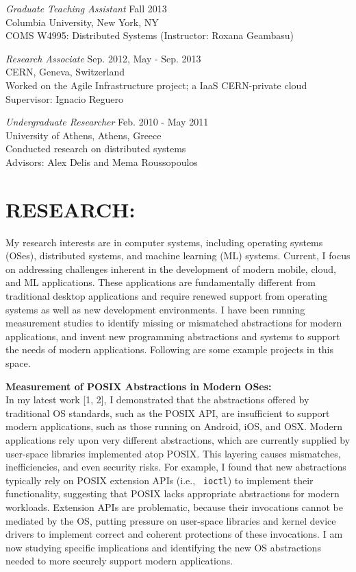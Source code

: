 \documentclass[overlapped,9pt]{res}
\begin{document}
\begin{resume}
  {\sl Graduate Teaching Assistant} \hfill Fall 2013\\
  Columbia University, New York, NY \\
  COMS W4995: Distributed Systems (Instructor: Roxana Geambasu)

  {\sl Research Associate} \hfill Sep. 2012, May - Sep. 2013 \\
  CERN, Geneva, Switzerland\\
  Worked on the Agile Infrastructure project; a IaaS CERN-private cloud\\
  Supervisor: Ignacio Reguero

  {\sl Undergraduate Researcher} \hfill Feb. 2010 - May 2011 \\
  University of Athens, Athens, Greece\\
  Conducted research on distributed systems\\
  Advisors: Alex Delis and Mema Roussopoulos

\section{RESEARCH:}
My research interests are in computer systems, including operating systems
(OSes), distributed systems, and machine learning (ML) systems. Current, I focus
on addressing challenges inherent in the development of modern mobile, cloud,
and ML applications. These applications are fundamentally different from
traditional desktop applications and require renewed support from operating
systems as well as new development environments. I have been running measurement
studies to identify missing or mismatched abstractions for modern applications,
and invent new programming abstractions and systems to support the needs of
modern applications. Following are some example projects in this space.

\textbf{Measurement of POSIX Abstractions in Modern OSes:}\\
In my latest work [1, 2], I demonstrated that the abstractions offered by
traditional OS standards, such as the POSIX API, are insufficient to support
modern applications, such as those running on Android, iOS, and OSX. Modern
applications rely upon very different abstractions, which are currently supplied
by user-space libraries implemented atop POSIX. This layering
causes mismatches, inefficiencies, and even security risks.  For example, I
found that new abstractions typically rely on POSIX extension APIs (i.e., {\tt
ioctl}) to implement their functionality, suggesting that POSIX lacks
appropriate abstractions for modern
workloads. Extension APIs are problematic, because their invocations cannot be
mediated by the OS, putting pressure on user-space libraries and kernel device
drivers to implement correct and coherent protections of these invocations.
I am now studying specific implications and identifying the new OS abstractions
needed to more securely support modern applications.


\end{resume}
\end{document}

